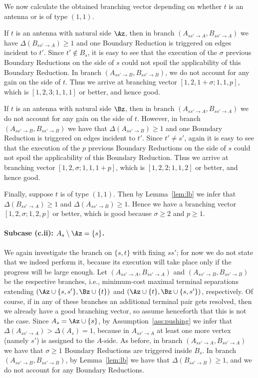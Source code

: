 We now calculate the obtained branching vector depending on whether $t$ is an antenna or is of type $(1,1)$.

If $t$ is an antenna with natural side $\Az$, then in branch $(A_{ss'\to A},B_{ss'\to A})$ we have $\Delta(B_{ss'\to A})\geq 1$ and one Boundary Reduction is triggered on edges incident to $t'$. Since $t'\notin B_s$, it is easy to see that the execution of the $\sigma$ previous Boundary Reductions on the side of $s$ could not spoil the applicability of this Boundary Reduction. In branch $(A_{ss'\to B},B_{ss'\to B})$, we do not account for any gain on the side of $t$. Thus we arrive at branching vector $[1,2,1+\sigma;1,1,p]$, which is $[1,2,3;1,1,1]$ or better, and hence good.

If $t$ is an antenna with natural side $\Bz$, then in branch $(A_{ss'\to A},B_{ss'\to A})$ we do not account for any gain on the side of $t$. However, in branch $(A_{ss'\to B},B_{ss'\to B})$ we have that $\Delta(A_{ss'\to B})\geq 1$ and one Boundary Reduction is triggered on edges incident to $t'$. Since $t'\neq s'$, again it is easy to see that the execution of the $p$ previous Boundary Reductions on the side of $s$ could not spoil the applicability of this Boundary Reduction. Thus we arrive at branching vector $[1,2,\sigma;1,1,1+p]$, which is $[1,2,2;1,1,2]$ or better, and hence good.

Finally, suppose $t$ is of type $(1,1)$. Then by Lemma~\ref{lem:lb} we infer that $\Delta(B_{ss'\to A})\geq 1$ and $\Delta(A_{ss'\to B})\geq 1$. Hence we have a branching vector $[1,2,\sigma;1,2,p]$ or better, which is good because $\sigma\geq 2$ and $p\geq 1$.











\paragraph*{Subcase (c.ii): $A_s\setminus\Az=\{s\}$.}



We again investigate the branch on $\{s,t\}$ with fixing $ss'$; for now we do not state that we indeed perform it, because its execution will take place only if the progress will be large enough. Let $(A_{ss'\to A},B_{ss'\to A})$ and $(A_{ss'\to B},B_{ss'\to B})$ be the respective branches, i.e., minimum-cost maximal terminal separations extending $(\Az\cup \{s,s'\},\Bz\cup \{t\})$ and $(\Az\cup \{t\},\Bz\cup \{s,s'\})$, respectively. Of course, if in any of these branches an additional terminal pair gets resolved, then we already have a good branching vector, so assume henceforth that this is not the case. Since $A_s=\Az\cup \{s\}$, by Assumption~\ref{ass:pushing} we infer that $\Delta(A_{ss'\to A})>\Delta(A_s)=1$, because in $A_{ss'\to A}$ at least one more vertex (namely $s'$) is assigned to the $A$-side. As before, in branch $(A_{ss'\to A},B_{ss'\to A})$ we have that $\sigma\geq 1$ Boundary Reductions are triggered inside $B_s$. In branch $(A_{ss'\to B},B_{ss'\to B})$, by Lemma~\ref{lem:lb} we have that $\Delta(B_{ss'\to B})\geq 1$, and we do not account for any Boundary Reductions.

